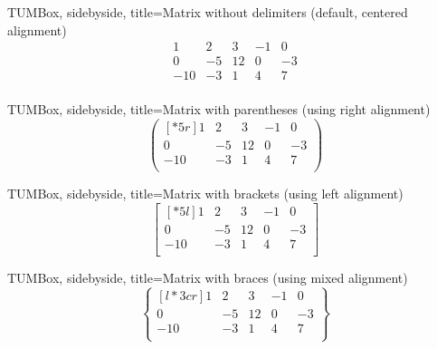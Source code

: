 \documentclass[DIV=13]{scrartcl}
\begin{document}
\begin{tcblisting}{TUMBox, sidebyside,
    title={Matrix without delimiters (default, centered alignment)}}
  \begin{equation}
    \begin{matrix}
      1   & 2  & 3  & -1 & 0  \\
      0   & -5 & 12 & 0  & -3 \\
      -10 & -3 & 1  & 4  & 7  \\
    \end{matrix}
  \end{equation}
\end{tcblisting}
\begin{tcblisting}{TUMBox, sidebyside,
    title=Matrix with parentheses (using right alignment)}
  \begin{equation}
    \begin{pmatrix}[*5r]
      1   & 2  & 3  & -1 & 0  \\
      0   & -5 & 12 & 0  & -3 \\
      -10 & -3 & 1  & 4  & 7  \\
    \end{pmatrix}
  \end{equation}
\end{tcblisting}
\begin{tcblisting}{TUMBox, sidebyside,
    title=Matrix with brackets (using left alignment)}
  \begin{equation}
    \begin{bmatrix}[*5l]
      1   & 2  & 3  & -1 & 0  \\
      0   & -5 & 12 & 0  & -3 \\
      -10 & -3 & 1  & 4  & 7  \\
    \end{bmatrix}
  \end{equation}
\end{tcblisting}
\begin{tcblisting}{TUMBox, sidebyside,
    title=Matrix with braces (using mixed alignment)}
  \begin{equation}
    \begin{Bmatrix}[l*3cr]
      1   & 2  & 3  & -1 & 0  \\
      0   & -5 & 12 & 0  & -3 \\
      -10 & -3 & 1  & 4  & 7  \\
    \end{Bmatrix}
  \end{equation}
\end{tcblisting}
\end{document}
